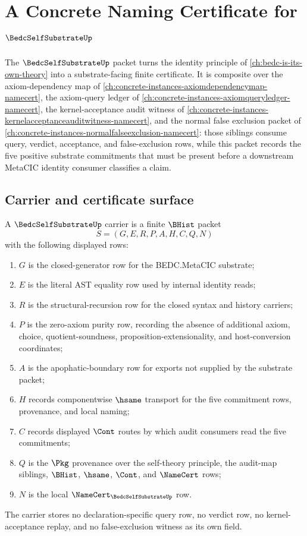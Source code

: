 \chapter{A Concrete Naming Certificate for $\BedcSelfSubstrateUp$}
\label{ch:concrete-instances-bedc-self-substrate-namecert}

The $\BedcSelfSubstrateUp$ packet turns the identity principle of \autoref{ch:bedc-is-its-own-theory} into a substrate-facing finite certificate. It is composite over the axiom-dependency map of \autoref{ch:concrete-instances-axiomdependencymap-namecert}, the axiom-query ledger of \autoref{ch:concrete-instances-axiomqueryledger-namecert}, the kernel-acceptance audit witness of \autoref{ch:concrete-instances-kernelacceptanceauditwitness-namecert}, and the normal false exclusion packet of \autoref{ch:concrete-instances-normalfalseexclusion-namecert}: those siblings consume query, verdict, acceptance, and false-exclusion rows, while this packet records the five positive substrate commitments that must be present before a downstream MetaCIC identity consumer classifies a claim.

\section{Carrier and certificate surface}
\label{sec:bedc-self-substrate-carrier}

\begin{definition}
\label{def:bedc-self-substrate-carrier}
A $\BedcSelfSubstrateUp$ carrier is a finite $\BHist$ packet
$$
S=(G,E,R,P,A,H,C,Q,N)
$$
with the following displayed rows:
\begin{enumerate}
\item $G$ is the closed-generator row for the BEDC.MetaCIC substrate;
\item $E$ is the literal AST equality row used by internal identity reads;
\item $R$ is the structural-recursion row for the closed syntax and history carriers;
\item $P$ is the zero-axiom purity row, recording the absence of additional axiom, choice, quotient-soundness, proposition-extensionality, and host-conversion coordinates;
\item $A$ is the apophatic-boundary row for exports not supplied by the substrate packet;
\item $H$ records componentwise $\hsame$ transport for the five commitment rows, provenance, and local naming;
\item $C$ records displayed $\Cont$ routes by which audit consumers read the five commitments;
\item $Q$ is the $\Pkg$ provenance over the self-theory principle, the audit-map siblings, $\BHist$, $\hsame$, $\Cont$, and $\NameCert$ rows;
\item $N$ is the local $\NameCert_{\BedcSelfSubstrateUp}$ row.
\end{enumerate}
The carrier stores no declaration-specific query row, no verdict row, no kernel-acceptance replay, and no false-exclusion witness as its own field.
\end{definition}

